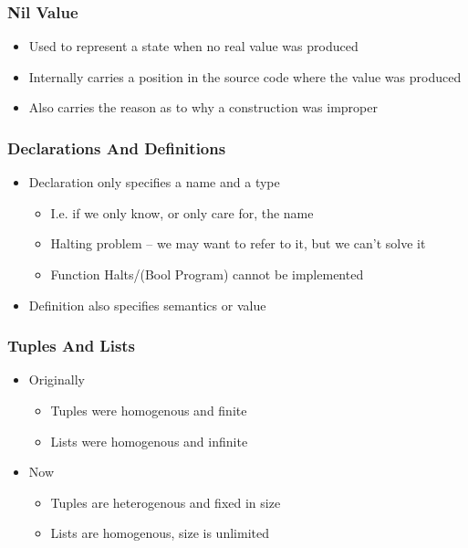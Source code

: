 \documentclass{beamer}
\begin{document}
\begin{frame}
    \frametitle{Nil Value}
    \begin{itemize}
        \item Used to represent a state when no real value was produced
        \item Internally carries a position in the source code where the value was produced
        \item Also carries the reason as to why a construction was improper
    \end{itemize}
\end{frame}

\begin{frame}
    \frametitle{Declarations And Definitions}
    \begin{itemize}
        \item Declaration only specifies a name and a type
            \begin{itemize}
                \item I.e. if we only know, or only care for, the name
                \item Halting problem -- we may want to refer to it,
                    but we can't solve it
                \item Function Halts/(Bool Program) cannot be implemented
            \end{itemize}
        \item Definition also specifies semantics or value
    \end{itemize}
\end{frame}

\begin{frame}
    \frametitle{Tuples And Lists}
    \begin{itemize}
        \item Originally
            \begin{itemize}
                \item Tuples were homogenous and finite
                \item Lists were homogenous and infinite
            \end{itemize}
        \item Now
            \begin{itemize}
                \item Tuples are heterogenous and fixed in size
                \item Lists are homogenous, size is unlimited
            \end{itemize}
    \end{itemize}
\end{frame}
\end{document}
